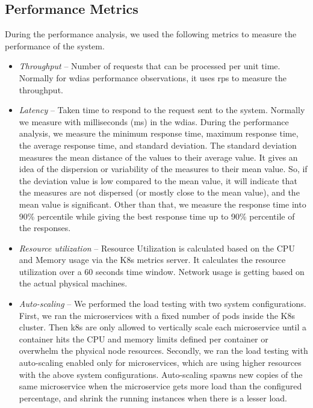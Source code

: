 \subsection{Performance Metrics}
\label{subse:test_plan_metrics}

During the performance analysis, we used the following metrics to measure the performance of the system.
\begin{itemize}
    \item \emph{Throughput} -- Number of requests that can be processed per unit time. 
    Normally for \acrshort{wdias} performance observations, it uses \acrfull{rps} to measure the throughput.
    \item \emph{Latency} -- Taken time to respond to the request sent to the system. 
    Normally we measure with milliseconds (ms) in the \acrshort{wdias}. During the performance analysis, we measure the minimum response time, maximum response time, the average response time, and standard deviation. The standard deviation measures the mean distance of the values to their average value. It gives an idea of the dispersion or variability of the measures to their mean value. So, if the deviation value is low compared to the mean value, it will indicate that the measures are not dispersed (or mostly close to the mean value), and the mean value is significant. Other than that, we measure the response time into 90\% percentile while giving the best response time up to 90\% percentile of the responses.
    \item \emph{Resource utilization} -- Resource Utilization is calculated based on the CPU and Memory usage via the K8s metrics server. It calculates the resource utilization over a 60 seconds time window. Network usage is getting based on the actual physical machines.
    \item \emph{Auto-scaling} -- We performed the load testing with two system configurations. First, we ran the microservices with a fixed number of pods inside the K8s cluster. Then k8s are only allowed to vertically scale each microservice until a container hits the CPU and memory limits defined per container or overwhelm the physical node resources. Secondly, we ran the load testing with auto-scaling enabled only for microservices, which are using higher resources with the above system configurations. Auto-scaling spawns new copies of the same microservice when the microservice gets more load than the configured percentage, and shrink the running instances when there is a lesser load.
\end{itemize}

